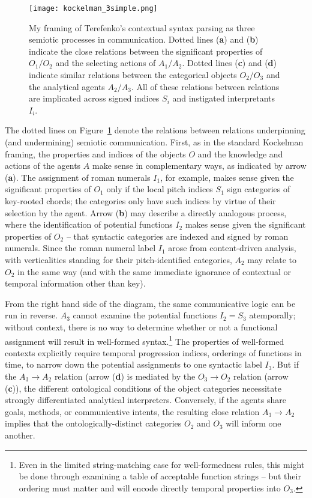 \begin{figure}
	\centering
	\caption{My framing of Terefenko's contextual syntax parsing as three semiotic processes in communication.  Dotted lines (\textbf{a}) and (\textbf{b}) indicate the close relations between the significant properties of $O_1 / O_2$ and the selecting actions of $A_1 / A_2$.  Dotted lines (\textbf{c}) and (\textbf{d}) indicate similar relations between the categorical objects $O_2 / O_3$ and the analytical agents $A_2 / A_3$.  All of these relations between relations are implicated across signed indices $S_i$ and instigated interpretants $I_i$.}%
	\label{k_t}
	\texttt{[image: kockelman\_3simple.png]}
\end{figure}

The dotted lines on Figure~\ref{k_t} denote the relations between relations underpinning (and undermining) semiotic communication.  First, as in the standard Kockelman framing, the properties and indices of the objects $O$ and the knowledge and actions of the agents $A$ make sense in complementary ways, as indicated by arrow (\textbf{a}).  The assignment of roman numerals $I_1$, for example, makes sense given the significant properties of $O_1$ only if the local pitch indices $S_1$ sign categories of key-rooted chords; the categories only have such indices by virtue of their selection by the agent.  Arrow (\textbf{b}) may describe a directly analogous process, where the identification of potential functions $I_2$ makes sense given the significant properties of $O_2$ -- that syntactic categories are indexed and signed by roman numerals.  Since the roman numeral label $I_1$ arose from content-driven analysis, with verticalities standing for their pitch-identified categories, $A_2$ may relate to $O_2$ in the same way (and with the same immediate ignorance of contextual or temporal information other than key).

From the right hand side of the diagram, the same communicative logic can be run in reverse.  $A_3$ cannot examine the potential functions $I_2 = S_3$ atemporally; without context, there is no way to determine whether or not a functional assignment will result in well-formed syntax.\footnote{Even in the limited string-matching case for well-formedness rules, this might be done through examining a table of acceptable function strings -- but their ordering must matter and will encode directly temporal properties into $O_3$.}  The properties of well-formed contexts explicitly require temporal progression indices, orderings of functions in time, to narrow down the potential assignments to one syntactic label $I_3$.  But if the $A_3 \rightarrow A_2$ relation (arrow (\textbf{d}) is mediated by the $O_3 \rightarrow  O_2$ relation (arrow (\textbf{c})), the different ontological conditions of the object categories necessitate strongly differentiated analytical interpreters.  Conversely, if the agents share goals, methods, or communicative intents, the resulting close relation $A_3 
\rightarrow A_2$ implies that the ontologically-distinct categories $O_2$ and $O_3$ will inform one another.

